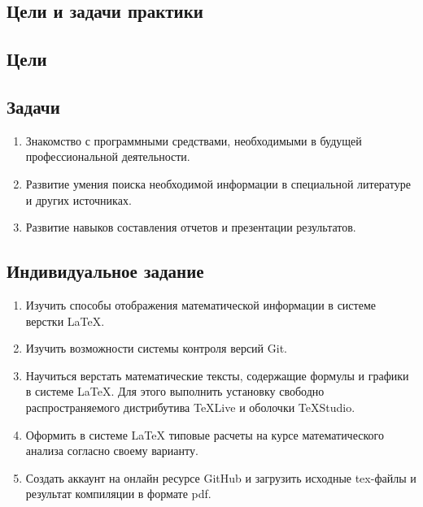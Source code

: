 \documentclass{article}
\begin{document}
\begin{flushleft}
  \section{Цели и задачи практики}
  \subsection{Цели\\}
  \subsection{Задачи}
  \begin{enumerate}
\setcounter{enumi}{0}
\item Знакомство с программными средствами, необходимыми в будущей профессиональной деятельности.
\item Развитие умения поиска необходимой информации в специальной литературе и других источниках.
\item Развитие навыков составления отчетов и презентации результатов.
\end{enumerate}
\subsection{Индивидуальное задание}
\begin{enumerate}
\setcounter{enumi}{0}
\item Изучить способы отображения математической информации в системе верстки {\LaTeX}.
\item Изучить возможности системы контроля версий Git.
\item Научиться верстать математические тексты, содержащие формулы и графики в системе {\LaTeX}. Для этого выполнить установку свободно распространяемого дистрибутива TeXLive  и оболочки TeXStudio.
\item Оформить в системе {\LaTeX} типовые расчеты на курсе математического анализа согласно своему варианту.
\item Создать аккаунт на онлайн ресурсе GitHub и загрузить исходные tex-файлы и результат компиляции в формате pdf. 
\end{enumerate}
\end{flushleft}
\newpage
\end{document}

